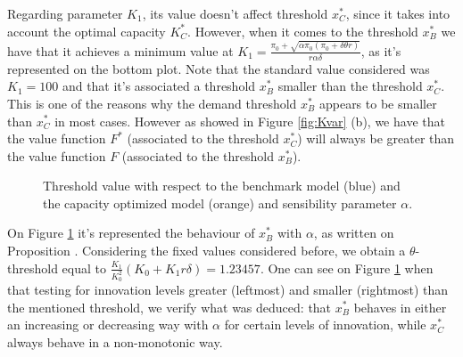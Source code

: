 Regarding parameter $K_1$, its value doesn't affect threshold $x^*_C$, since it takes into account the optimal capacity $K^*_C$. However, when it comes to the threshold $x^*_B$ we have that it achieves a minimum value at $K_1=\frac{\pi_0+\sqrt{\alpha \pi_0(\pi_0+\delta \theta r)}}{r\alpha \delta}$, as it's represented on the bottom plot. Note that the standard value considered was $K_1=100$ and that it's associated a threshold $x_B^*$ smaller than the threshold $x_C^*$. This is one of the reasons why the demand threshold $x_B^*$ appears to be smaller than $x_C^*$ in most cases. However as showed in Figure \ref{fig:Kvar} (b), we have that the value function $F^*$ (associated to the threshold $x_C^*$) will always be greater than the value function $F$ (associated to the threshold $x_B^*$).
	
	\begin{figure}[!htb]
		\begin{subfigmatrix}{2}
		\end{subfigmatrix}
		\caption{Threshold value with respect to the benchmark model (blue) and the capacity optimized model (orange) and sensibility parameter $\alpha$.}
		\label{fig:2_x4}
	\end{figure}
	
	On Figure \ref{fig:2_x4} it's represented the behaviour of $x^*_B$ with $\alpha$, as written on Proposition \label{3_prop2}. Considering the fixed values considered before, we obtain a $\theta$-threshold equal to $\frac{K_1}{ K_0^2} (K_0+K_1 r \delta)=1.23457$. One can see on Figure \ref{fig:2_x4} when that testing for innovation levels greater (leftmost) and smaller (rightmost) than the mentioned threshold, we verify what was deduced: that $x^*_B$ behaves in either an increasing or decreasing way with $\alpha$ for certain levels of innovation, while $x_C^*$ always behave in a non-monotonic way.

